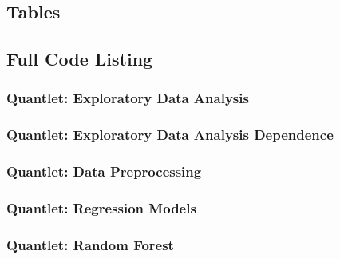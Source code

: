 \subsection{Tables}





\label{table:regs}





\FloatBarrier

\subsection{Full Code Listing}
\subsubsection{Quantlet: Exploratory Data Analysis}

\subsubsection{Quantlet: Exploratory Data Analysis Dependence}

\subsubsection{Quantlet: Data Preprocessing}

\subsubsection{Quantlet: Regression Models}

\subsubsection{Quantlet: Random Forest}


